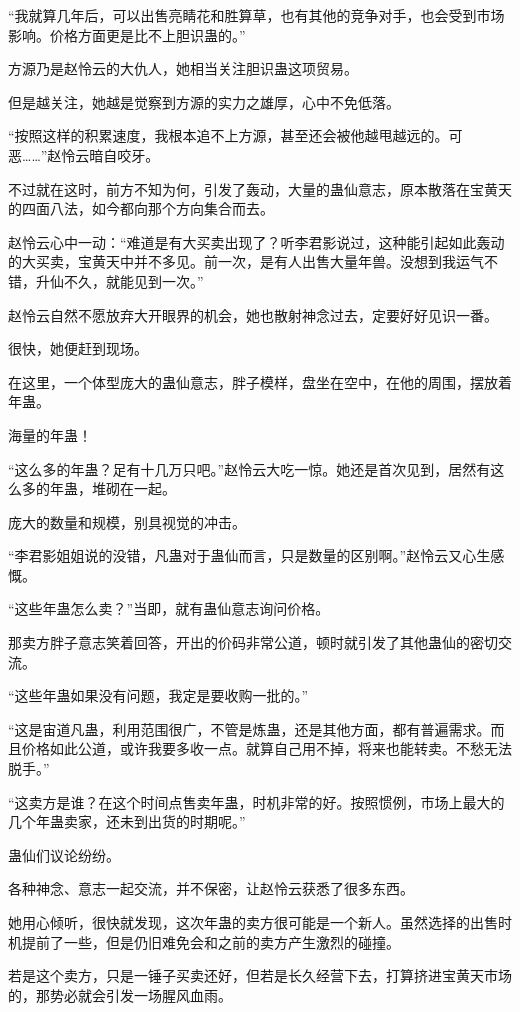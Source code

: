 \begin{this_body}
“我就算几年后，可以出售亮睛花和胜算草，也有其他的竞争对手，也会受到市场影响。价格方面更是比不上胆识蛊的。”

方源乃是赵怜云的大仇人，她相当关注胆识蛊这项贸易。

但是越关注，她越是觉察到方源的实力之雄厚，心中不免低落。

“按照这样的积累速度，我根本追不上方源，甚至还会被他越甩越远的。可恶……”赵怜云暗自咬牙。

不过就在这时，前方不知为何，引发了轰动，大量的蛊仙意志，原本散落在宝黄天的四面八法，如今都向那个方向集合而去。

赵怜云心中一动：“难道是有大买卖出现了？听李君影说过，这种能引起如此轰动的大买卖，宝黄天中并不多见。前一次，是有人出售大量年兽。没想到我运气不错，升仙不久，就能见到一次。”

赵怜云自然不愿放弃大开眼界的机会，她也散射神念过去，定要好好见识一番。

很快，她便赶到现场。

在这里，一个体型庞大的蛊仙意志，胖子模样，盘坐在空中，在他的周围，摆放着年蛊。

海量的年蛊！

“这么多的年蛊？足有十几万只吧。”赵怜云大吃一惊。她还是首次见到，居然有这么多的年蛊，堆砌在一起。

庞大的数量和规模，别具视觉的冲击。

“李君影姐姐说的没错，凡蛊对于蛊仙而言，只是数量的区别啊。”赵怜云又心生感慨。

“这些年蛊怎么卖？”当即，就有蛊仙意志询问价格。

那卖方胖子意志笑着回答，开出的价码非常公道，顿时就引发了其他蛊仙的密切交流。

“这些年蛊如果没有问题，我定是要收购一批的。”

“这是宙道凡蛊，利用范围很广，不管是炼蛊，还是其他方面，都有普遍需求。而且价格如此公道，或许我要多收一点。就算自己用不掉，将来也能转卖。不愁无法脱手。”

“这卖方是谁？在这个时间点售卖年蛊，时机非常的好。按照惯例，市场上最大的几个年蛊卖家，还未到出货的时期呢。”

蛊仙们议论纷纷。

各种神念、意志一起交流，并不保密，让赵怜云获悉了很多东西。

她用心倾听，很快就发现，这次年蛊的卖方很可能是一个新人。虽然选择的出售时机提前了一些，但是仍旧难免会和之前的卖方产生激烈的碰撞。

若是这个卖方，只是一锤子买卖还好，但若是长久经营下去，打算挤进宝黄天市场的，那势必就会引发一场腥风血雨。


\end{this_body}
